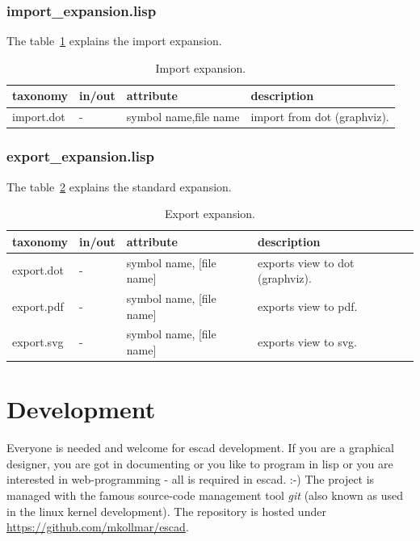 \documentclass[a4paper, 12pt, openany]{scrbook}
\begin{document}
\subsection{import\_expansion.lisp}
The table~\ref{tab:import-expansion} explains the import expansion.
\begin{table}[htbp]
\centering
\begin{tabular}{|p{3.5cm}|p{4cm}|p{4cm}|p{4cm}|}
  \hline
  \textbf{taxonomy} & \textbf{in/out} & \textbf{attribute} & \textbf{description} \\
  \hline
  import.dot & - & symbol name,\newline file name & import from dot (graphviz). \\
  \hline
\end{tabular}
\caption{Import expansion.}
\label{tab:import-expansion}
\end{table}
\subsection{export\_expansion.lisp}
The table~\ref{tab:export-expansion} explains the standard expansion.
\begin{table}[htbp]
\centering
\begin{tabular}{|p{3.5cm}|p{4cm}|p{4cm}|p{4cm}|}
  \hline
  \textbf{taxonomy} & \textbf{in/out} & \textbf{attribute} & \textbf{description} \\
  \hline
  export.dot & - & symbol name, [file name] & exports view to dot (graphviz). \\
  \hline
  export.pdf & - & symbol name, [file name] & exports view to pdf. \\
  \hline
  export.svg & - & symbol name, [file name] & exports view to svg. \\
  \hline
\end{tabular}
\caption{Export expansion.}
\label{tab:export-expansion}
\end{table}
\chapter{Development}
Everyone is needed and welcome for escad development. If you are a graphical designer, you are got in documenting or you like to program in lisp or you are interested in web-programming - all is required in escad. :-)
The project is managed with the famous source-code management tool \emph{git} (also known as used in the linux kernel development). The repository is hosted under \url{https://github.com/mkollmar/escad}.
\end{document}
